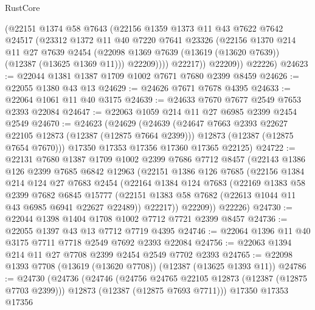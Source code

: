 \begin{lexlean}{RustCore}
\begin{coremodule}
              (@22151
                @1374
                @58
                @7643
                (@22156
                  @1359
                  @1373
                  @11
                  @43
                  @7622
                  @7642
                  @24517
                  (@23312
                    @1372
                    @11
                    @40
                    @7220
                    @7641
                    @23326
                    (@22156
                      @1370
                      @214
                      @11
                      @27
                      @7639
                      @2454
                      (@22098 @1369 @7639 (@13619 (@13620 @7639)) (@12387 (@13625 @1369 @11)))
                      @22209))))
              @22217))
          @22209))
      @22226)
@24623 := @22044 @1381 @1387 @1709 @1002 @7671 @7680 @2399 @8459
@24626 := @22055 @1380 @43 @13
@24629 := @24626 @7671 @7678 @4395
@24633 := @22064 @1061 @11 @40 @3175
@24639 := @24633 @7670 @7677 @2549 @7653 @2393 @22084
@24647 := @22063 @1059 @214 @11 @27 @6985 @2399 @2454 @2549
@24670 := @24623
    (@24629
      (@24639
        (@24647 @7663 @2393 @22627 @22105 @12873 (@12387 (@12875 @7664 @2399)))
        @12873
        (@12387 (@12875 @7654 @7670)))
      @17350
      @17353
      @17356
      @17360
      @17365
      @22125)
@24722 := @22131
    @7680
    @1387
    @1709
    @1002
    @2399
    @7686
    @7712
    @8457
    (@22143
      @1386
      @126
      @2399
      @7685
      @6842
      @12963
      (@22151
        @1386
        @126
        @7685
        (@22156
          @1384
          @214
          @124
          @27
          @7683
          @2454
          (@22164
            @1384
            @124
            @7683
            (@22169
              @1383
              @58
              @2399
              @7682
              @6845
              @15777
              (@22151 @1383 @58 @7682 (@22613 @1044 @11 @43 @6985 @6941 @22627 @22489))
              @22217))
          @22209))
      @22226)
@24730 := @22044 @1398 @1404 @1708 @1002 @7712 @7721 @2399 @8457
@24736 := @22055 @1397 @43 @13 @7712 @7719 @4395
@24746 := @22064 @1396 @11 @40 @3175 @7711 @7718 @2549 @7692 @2393 @22084
@24756 := @22063 @1394 @214 @11 @27 @7708 @2399 @2454 @2549 @7702 @2393
@24765 := @22098 @1393 @7708 (@13619 (@13620 @7708)) (@12387 (@13625 @1393 @11))
@24786 := @24730
    (@24736
      (@24746
        (@24756 @24765 @22105 @12873 (@12387 (@12875 @7703 @2399)))
        @12873
        (@12387 (@12875 @7693 @7711)))
      @17350
      @17353
      @17356

\end{coremodule}
\end{lexlean}
